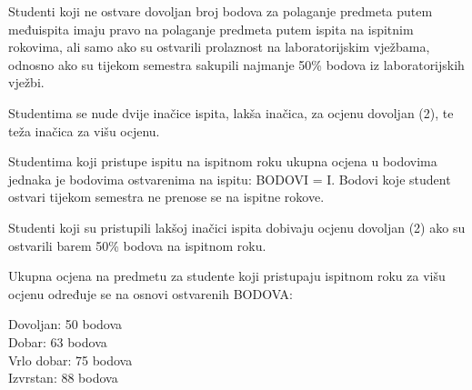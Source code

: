 \documentclass[times, 12pt, utf8]{book}
\newenvironment{myindentpar}[1]%
{\begin{list}{}%
         {\setlength{\leftmargin}{#1}}%
         \item[]%
}
{\end{list}}
\begin{document}
Studenti koji ne ostvare dovoljan broj bodova za polaganje predmeta putem međuispita imaju pravo na polaganje predmeta putem ispita na ispitnim rokovima, ali samo ako su ostvarili prolaznost na laboratorijskim vježbama, odnosno ako su tijekom semestra sakupili najmanje 50\% bodova iz laboratorijskih vježbi.

Studentima se nude dvije inačice ispita, lakša inačica, za ocjenu dovoljan (2), te teža inačica za višu ocjenu.

Studentima koji pristupe ispitu na ispitnom roku ukupna ocjena u bodovima jednaka je bodovima ostvarenima na ispitu: BODOVI = I.
Bodovi koje student ostvari tijekom semestra ne prenose se na ispitne rokove.

Studenti koji su pristupili lakšoj inačici ispita dobivaju ocjenu dovoljan (2) ako su ostvarili barem 50\% bodova na ispitnom roku.

Ukupna ocjena na predmetu za studente koji pristupaju ispitnom roku za višu ocjenu određuje se na osnovi ostvarenih BODOVA:
\begin{myindentpar}{30pt}
Dovoljan: 50 bodova \\
Dobar: 63 bodova \\
Vrlo dobar: 75 bodova \\
Izvrstan: 88 bodova 
\end{myindentpar}
\end{document}
